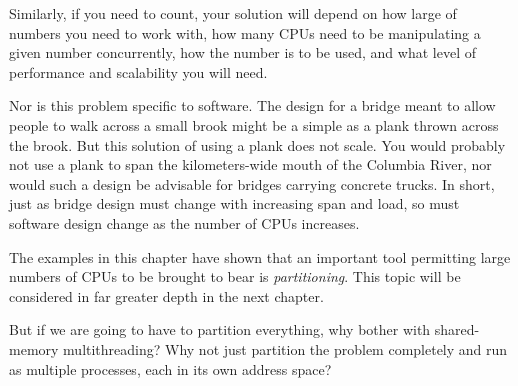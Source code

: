Similarly, if you need to count, your solution will depend on how large
of numbers you need to work with, how many CPUs need to be manipulating
a given number concurrently, how the number is to be used, and what
level of performance and scalability you will need.

Nor is this problem specific to software.
The design for a bridge meant to allow people to walk across a small brook
might be a simple as a plank thrown across the brook.
But this solution of using a plank does not scale.
You would probably not use a plank to span the kilometers-wide mouth of
the Columbia River, nor would such a design be advisable for bridges
carrying concrete trucks.
In short, just as bridge design must change with increasing span and load,
so must software design change as the number of CPUs increases.

The examples in this chapter have shown that an important tool permitting
large numbers of CPUs to be brought to bear is \emph{partitioning}.
This topic will be considered in far greater depth in the next chapter.

\QuickQuiz{}
	But if we are going to have to partition everything, why bother
	with shared-memory multithreading?
	Why not just partition the problem completely and run as
	multiple processes, each in its own address space?
 \QuickQuizEnd

